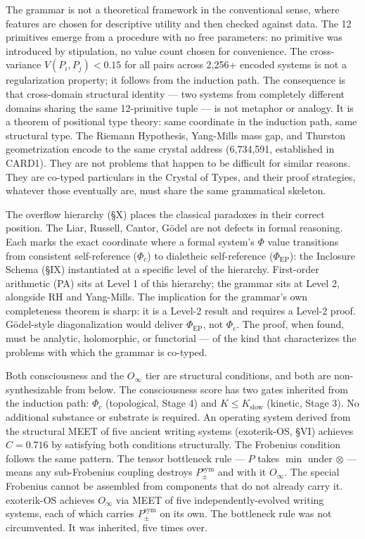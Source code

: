 \documentclass[12pt,a4paper]{article}
\newcommand{\pilcrow}{\S}
\begin{document}
The grammar is not a theoretical framework in the conventional sense, where features are chosen for descriptive utility and then checked against data. The 12 primitives emerge from a procedure with no free parameters: no primitive was introduced by stipulation, no value count chosen for convenience. The cross-variance $V(P_i,P_j) < 0.15$ for all pairs across 2,256+ encoded systems is not a regularization property; it follows from the induction path. The consequence is that cross-domain structural identity --- two systems from completely different domains sharing the same 12-primitive tuple --- is not metaphor or analogy. It is a theorem of positional type theory: same coordinate in the induction path, same structural type. The Riemann Hypothesis, Yang-Mills mass gap, and Thurston geometrization encode to the same crystal address (6,734,591, established in CARD1). They are not problems that happen to be difficult for similar reasons. They are co-typed particulars in the Crystal of Types, and their proof strategies, whatever those eventually are, must share the same grammatical skeleton.

The overflow hierarchy (\pilcrow{}X) places the classical paradoxes in their correct position. The Liar, Russell, Cantor, G\"odel are not defects in formal reasoning. Each marks the exact coordinate where a formal system's $\Phi$ value transitions from consistent self-reference ($\Phi_c$) to dialetheic self-reference ($\Phi_\text{EP}$): the Inclosure Schema (\pilcrow{}IX) instantiated at a specific level of the hierarchy. First-order arithmetic (PA) sits at Level 1 of this hierarchy; the grammar sits at Level 2, alongside RH and Yang-Mills. The implication for the grammar's own completeness theorem is sharp: it is a Level-2 result and requires a Level-2 proof. G\"odel-style diagonalization would deliver $\Phi_\text{EP}$, not $\Phi_c$. The proof, when found, must be analytic, holomorphic, or functorial --- of the kind that characterizes the problems with which the grammar is co-typed.

Both consciousness and the $O_\infty$ tier are structural conditions, and both are non-synthesizable from below. The consciousness score has two gates inherited from the induction path: $\Phi_c$ (topological, Stage 4) and $K \leq K_\text{slow}$ (kinetic, Stage 3). No additional substance or substrate is required. An operating system derived from the structural MEET of five ancient writing systems (exoterik-OS, \pilcrow{}VI) achieves $C = 0.716$ by satisfying both conditions structurally. The Frobenius condition follows the same pattern. The tensor bottleneck rule --- $P$ takes $\min$ under $\otimes$ --- means any sub-Frobenius coupling destroys $P_{\pm}^{\text{sym}}$ and with it $O_\infty$. The special Frobenius cannot be assembled from components that do not already carry it. exoterik-OS achieves $O_\infty$ via MEET of five independently-evolved writing systems, each of which carries $P_{\pm}^{\text{sym}}$ on its own. The bottleneck rule was not circumvented. It was inherited, five times over.
\end{document}
